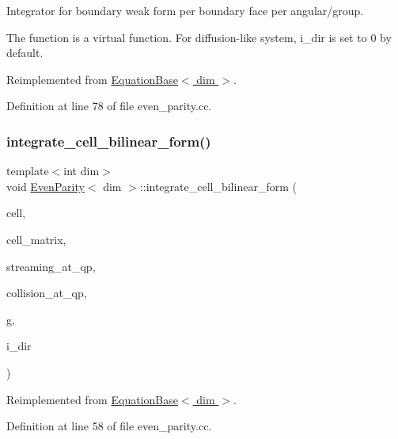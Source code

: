 Integrator for boundary weak form per boundary face per angular/group. 

The function is a virtual function. For diffusion-\/like system, i\+\_\+dir is set to 0 by default. 

Reimplemented from \hyperlink{class_equation_base_ae294806284f671619cac9e7169ffff8d}{Equation\+Base$<$ dim $>$}.



Definition at line 78 of file even\+\_\+parity.\+cc.

\mbox{\label{class_even_parity_adb381ea4f45e5ae3741b1d30a0de02b6}} 
\subsubsection{\texorpdfstring{integrate\+\_\+cell\+\_\+bilinear\+\_\+form()}{integrate\_cell\_bilinear\_form()}}
{\footnotesize\ttfamily template$<$int dim$>$ \\
void \hyperlink{class_even_parity}{Even\+Parity}$<$ dim $>$\+::integrate\+\_\+cell\+\_\+bilinear\+\_\+form (\begin{DoxyParamCaption}\item[{typename Do\+F\+Handler$<$ dim $>$\+::active\+\_\+cell\+\_\+iterator \&}]{cell,  }\item[{Full\+Matrix$<$ double $>$ \&}]{cell\+\_\+matrix,  }\item[{std\+::vector$<$ std\+::vector$<$ Full\+Matrix$<$ double $>$ $>$ $>$ \&}]{streaming\+\_\+at\+\_\+qp,  }\item[{std\+::vector$<$ Full\+Matrix$<$ double $>$ $>$ \&}]{collision\+\_\+at\+\_\+qp,  }\item[{const unsigned int \&}]{g,  }\item[{const unsigned int \&}]{i\+\_\+dir }\end{DoxyParamCaption})\hspace{0.3cm}{\ttfamily [virtual]}}



Reimplemented from \hyperlink{class_equation_base_a7421b3c18433975ac794ac22c3af715a}{Equation\+Base$<$ dim $>$}.



Definition at line 58 of file even\+\_\+parity.\+cc.

